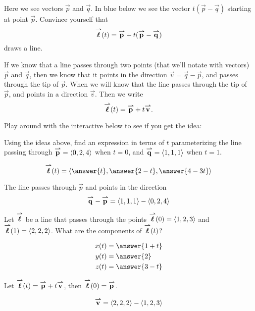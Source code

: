 \documentclass{ximera}
\begin{document}
\begin{onlineOnly}
  Here we see vectors $\vec{p}$ and $\vec{q}$. In blue below we see
  the vector $t(\vec{p}-\vec{q})$ starting at point $\vec{p}$. Convince yourself that
  \[
  \vecl(t) = \vec{p} + t(\vec{p}-\vec{q}) 
  \]
  draws a line.
  \begin{center}
  \end{center}
\end{onlineOnly}
If we know that a line passes through two points (that we'll notate
with vectors) $\vec{p}$ and $\vec{q}$, then we know that it points in
the direction $\vec{v} = \vec{q} - \vec{p}$, and passes through the
tip of $\vec{p}$. When we will know that the line passes through the
tip of $\vec{p}$, and points in a direction $\vec{v}$.  Then we write
\[
\vecl(t) = \vec{p}+t\vec{v}.
\]
\begin{onlineOnly}
  Play around with the interactive below to see if you get the idea:
  \begin{center}
  \end{center}
\end{onlineOnly}

\begin{question}
  Using the ideas above, find an expression in terms of $t$
  parameterizing the line passing through $\vec{p} = \vector{0,2,4}$
  when $t=0$, and $\vec{q} = \vector{1,1,1}$ when $t=1$.
  \begin{prompt}
  \[
  \vecl(t) = \vector{\answer{t},\answer{2-t},\answer{4-3t}}
  \]
  \end{prompt}
  \begin{hint}
    The line passes through $\vec{p}$ and points in the direction
    \[
    \vec{q} - \vec{p} = \vector{1,1,1} - \vector{0,2,4}
    \]
  \end{hint}
\end{question}


\begin{question}
  Let $\vecl$ be a line that passes through the points $\vecl(0) =
  \vector{1,2,3}$ and $\vecl(1) = \vector{2,2,2}$. What are the
  components of $\vecl(t)$?
  \begin{prompt}
  \begin{align*}
    x(t) &= \answer{1+t}\\
    y(t) &= \answer{2}\\
    z(t) &= \answer{3-t}
  \end{align*}
  \end{prompt}
  \begin{hint}
    Let $\vecl(t) = \vec{p}+t\vec{v}$, then $\vecl(0) = \vec{p}$. 
  \end{hint}
  \begin{hint}
    \[
    \vec{v}= \vector{2,2,2}-\vector{1,2,3}
    \]
  \end{hint}
\end{question}
\end{document}
